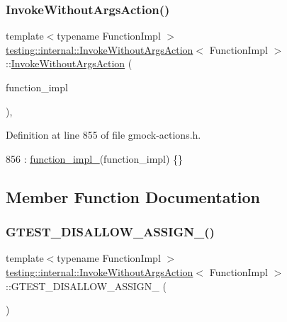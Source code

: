 \subsubsection{\texorpdfstring{Invoke\+Without\+Args\+Action()}{InvokeWithoutArgsAction()}}
{\footnotesize\ttfamily template$<$typename Function\+Impl $>$ \\
\hyperlink{classtesting_1_1internal_1_1InvokeWithoutArgsAction}{testing\+::internal\+::\+Invoke\+Without\+Args\+Action}$<$ Function\+Impl $>$\+::\hyperlink{classtesting_1_1internal_1_1InvokeWithoutArgsAction}{Invoke\+Without\+Args\+Action} (\begin{DoxyParamCaption}\item[{Function\+Impl}]{function\+\_\+impl }\end{DoxyParamCaption})\hspace{0.3cm}{\ttfamily [inline]}, {\ttfamily [explicit]}}



Definition at line 855 of file gmock-\/actions.\+h.


\begin{DoxyCode}
856       : \hyperlink{classtesting_1_1internal_1_1InvokeWithoutArgsAction_a29e9e7e089dd4b66fc931c0da54809b1}{function\_impl\_}(function\_impl) \{\}
\end{DoxyCode}


\subsection{Member Function Documentation}
\mbox{\label{classtesting_1_1internal_1_1InvokeWithoutArgsAction_a0fd67dbc88793c8a9cf3c31ab44de1c0}} 
\subsubsection{\texorpdfstring{G\+T\+E\+S\+T\+\_\+\+D\+I\+S\+A\+L\+L\+O\+W\+\_\+\+A\+S\+S\+I\+G\+N\+\_\+()}{GTEST\_DISALLOW\_ASSIGN\_()}}
{\footnotesize\ttfamily template$<$typename Function\+Impl $>$ \\
\hyperlink{classtesting_1_1internal_1_1InvokeWithoutArgsAction}{testing\+::internal\+::\+Invoke\+Without\+Args\+Action}$<$ Function\+Impl $>$\+::G\+T\+E\+S\+T\+\_\+\+D\+I\+S\+A\+L\+L\+O\+W\+\_\+\+A\+S\+S\+I\+G\+N\+\_\+ (\begin{DoxyParamCaption}\item[{\hyperlink{classtesting_1_1internal_1_1InvokeWithoutArgsAction}{Invoke\+Without\+Args\+Action}$<$ Function\+Impl $>$}]{ }\end{DoxyParamCaption})\hspace{0.3cm}{\ttfamily [private]}}

